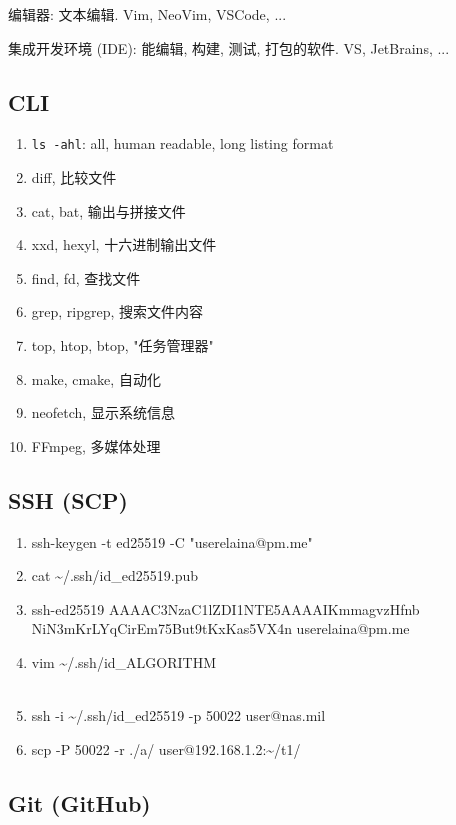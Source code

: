 \documentclass[a4paper]{article}
\begin{document}
编辑器: 文本编辑. Vim, NeoVim, VSCode, ...

集成开发环境 (IDE): 能编辑, 构建, 测试, 打包的软件. VS, JetBrains, ...

\subsection{\LARGE CLI}

\begin{enumerate}[leftmargin=1cm, itemindent=1cm]
    \item {\tt ls -ahl}: all, human readable, long listing format
    \item diff, 比较文件
    \item cat, bat, 输出与拼接文件
    \item xxd, hexyl, 十六进制输出文件
    \item find, fd, 查找文件
    \item grep, ripgrep, 搜索文件内容
    \item top, htop, btop, "任务管理器"
    \item make, cmake, 自动化
    \item neofetch, 显示系统信息
    \item FFmpeg, 多媒体处理
\end{enumerate}

\subsection{\LARGE SSH (SCP)}

\begin{enumerate}[leftmargin=1cm, itemindent=1cm]
    \tt
    \item ssh-keygen -t ed25519 -C "userelaina@pm.me"
    \item cat \textasciitilde/.ssh/id\_ed25519.pub
    \item ssh-ed25519 AAAAC3NzaC1lZDI1NTE5AAAAIKmmagvzHfnb NiN3mKrLYqCirEm75But9tKxKas5VX4n userelaina@pm.me
    \item vim \textasciitilde/.ssh/id\_ALGORITHM
    \\ \quad \\
    \item ssh -i \textasciitilde/.ssh/id\_ed25519 -p 50022 user@nas.mil
    \item scp -P 50022 -r ./a/ user@192.168.1.2:\textasciitilde/t1/
\end{enumerate}

\subsection{\LARGE Git (GitHub)}
\end{document}
